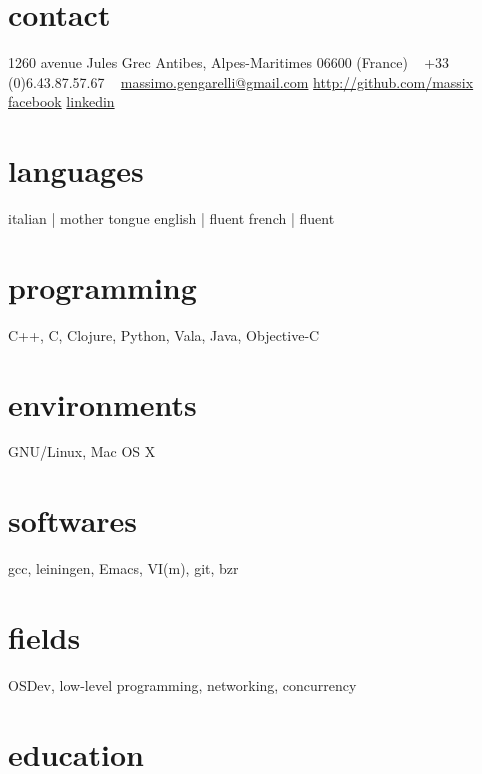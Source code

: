 \documentclass[]{friggeri-cv}
\begin{document}


\begin{aside} %
  \section{contact}
  1260 avenue Jules Grec
  Antibes, Alpes-Maritimes
  06600 (France)
  ~
  +33 (0)6.43.87.57.67
  ~
  \href{mailto:massimo.gengarelli@gmail.com}{massimo.gengarelli@gmail.com}
  \href{http://github.com/massix/}{http://github.com/massix}
  \href{http://facebook.com/massimo.gengarelli}{facebook}
  \href{http://fr.linkedin.com/pub/massimo-gengarelli/46/375/468/}{linkedin}
  \section{languages}
  italian | mother tongue
  english | fluent
  french  | fluent
  \section{programming}
  C++, C, Clojure, Python,
  Vala, Java, Objective-C
  \section{environments}
  GNU/Linux, Mac OS X
  \section{softwares}
  gcc, leiningen, Emacs,
  VI(m), git, bzr
  \section{fields}
  OSDev, low-level programming,
  networking, concurrency
\end{aside}


\section{education}
\end{document}
